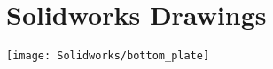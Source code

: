 \section{Solidworks Drawings}
\label{app:SolidworksDrawings}
\centering
\texttt{[image: Solidworks/bottom\_plate]} \newpage